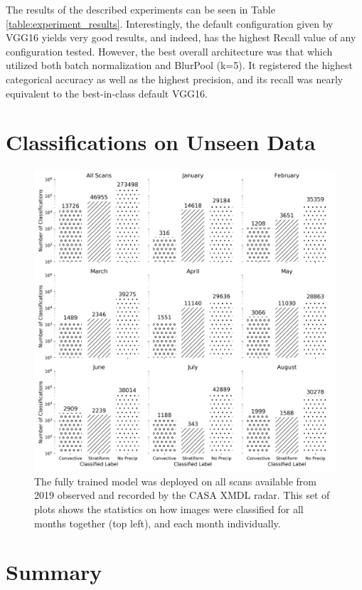 The results of the described experiments can be seen in Table \ref{table:experiment_results}.
Interestingly, the default configuration given by VGG16 yields very good results, and indeed, has the highest Recall value of any configuration tested.
However, the best overall architecture was that which utilized both batch normalization and BlurPool (k=5).
It registered the highest categorical accuracy as well as the highest precision, and its recall was nearly equivalent to the best-in-class default VGG16.

\section{Classifications on Unseen Data}
\label{sec:bestmodel_newdata}

\begin{figure}[!t]
	\centering
	\includegraphics[width=\textwidth]{./thesis_code/plots/2019_predictions_hist_bw.png}
	\caption{The fully trained model was deployed on all scans available from 2019 observed and recorded by the CASA XMDL radar. This set of plots shows the statistics on how images were classified for all months together (top left), and each month individually.}
	\label{fig:bestmodel_all_hists}
\end{figure}

\section{Summary}
\label{sec:bestmodel_summary}


